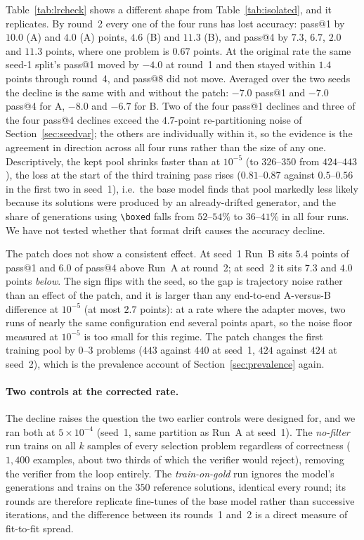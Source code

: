 \documentclass[runningheads]{llncs}
\begin{document}
Table~\ref{tab:lrcheck} shows a different shape from Table~\ref{tab:isolated},
and it replicates. By round~2 every one of the four runs has lost accuracy:
pass@1 by $10.0$ (A) and $4.0$ (A) points, $4.6$ (B) and $11.3$ (B), and pass@4
by $7.3$, $6.7$, $2.0$ and $11.3$ points, where one problem is $0.67$ points.
At the original rate the same seed-1 split's pass@1 moved by $-4.0$ at round~1
and then stayed within $1.4$ points through round~4, and pass@8 did not move.
Averaged over the two seeds the decline is the same with and without the
patch: $-7.0$ pass@1 and $-7.0$ pass@4 for A, $-8.0$ and $-6.7$ for B. Two of the
four pass@1 declines and three of the four pass@4 declines exceed the
$4.7$-point re-partitioning noise of Section~\ref{sec:seedvar}; the others are
individually within it, so the evidence is the agreement in direction across
all four runs rather than the size of any one. Descriptively, the kept pool shrinks
faster than at $10^{-5}$ (to $326$--$350$ from $424$--$443$), the loss at the
start of the third training pass rises ($0.81$--$0.87$ against $0.5$--$0.56$
in the first two in seed~1), i.e.\ the base model finds that pool markedly less
likely because its solutions were produced by an already-drifted generator,
and the share of generations using \texttt{\textbackslash boxed} falls from
$52$--$54\%$ to $36$--$41\%$ in all four runs. We have not tested whether that
format drift causes the accuracy decline.

The patch does not show a consistent effect. At seed~1 Run~B sits $5.4$ points
of pass@1 and $6.0$ of pass@4 above Run~A at round~2; at seed~2 it sits $7.3$
and $4.0$ points \emph{below}. The sign flips with the seed, so the gap is
trajectory noise rather than an effect of the patch, and it is larger than any
end-to-end A-versus-B difference at $10^{-5}$ (at most $2.7$ points): at a rate
where the adapter moves, two runs of nearly the same configuration end several
points apart, so the noise floor measured at $10^{-5}$ is too small for this
regime. The patch changes the first training pool by $0$--$3$ problems
($443$ against $440$ at seed~1, $424$ against $424$ at seed~2), which is the
prevalence account of Section~\ref{sec:prevalence} again.

\paragraph{Two controls at the corrected rate.}
The decline raises the question the two earlier controls were designed for, and
we ran both at $5\times10^{-4}$ (seed~1, same partition as Run~A at seed~1).
The \emph{no-filter} run trains on all $k$ samples of every selection problem
regardless of correctness ($1{,}400$ examples, about two thirds of which the verifier would reject),
removing the verifier from the loop entirely. The \emph{train-on-gold} run
ignores the model's generations and trains on the $350$ reference solutions,
identical every round; its rounds are therefore replicate fine-tunes of the
base model rather than successive iterations, and the difference between its
rounds~1 and~2 is a direct measure of fit-to-fit spread.
\end{document}
